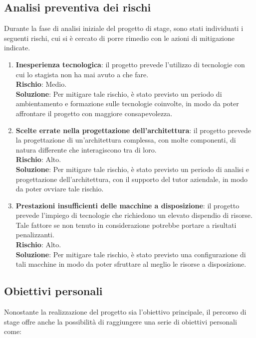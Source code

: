 \subsection{Analisi preventiva dei rischi}
Durante la fase di analisi iniziale del progetto di stage, sono stati individuati i seguenti rischi, cui si è cercato di porre rimedio con le azioni di mitigazione indicate. \\
\begin{enumerate}
    \item \textbf{Inesperienza tecnologica}: il progetto prevede l'utilizzo di tecnologie con cui lo stagista non ha mai avuto a che fare. \\
    \textbf{Rischio}: Medio.\\
    \textbf{Soluzione}: Per mitigare tale rischio, è stato previsto un periodo di ambientamento e formazione sulle tecnologie coinvolte, in modo da poter affrontare il progetto con maggiore consapevolezza.
    \item \textbf{Scelte errate nella progettazione dell'architettura}: il progetto prevede la progettazione di un'architettura complessa, con molte componenti, di natura differente che interagiscono tra di loro. \\
    \textbf{Rischio}: Alto.\\
    \textbf{Soluzione}: Per mitigare tale rischio, è stato previsto un periodo di analisi e progettazione dell'architettura, con il supporto del tutor aziendale, in modo da poter ovviare tale rischio.
    \item \textbf{Prestazioni insufficienti delle macchine a disposizione}: il progetto prevede l'impiego di tecnologie che richiedono un elevato dispendio di risorse. Tale fattore se non tenuto in considerazione potrebbe portare a risultati penalizzanti. \\
    \textbf{Rischio}: Alto.\\
    \textbf{Soluzione}: Per mitigare tale rischio, è stato previsto una configurazione di tali macchine in modo da poter sfruttare al meglio le risorse a disposizione.
\end{enumerate}    
\subsection{Obiettivi personali}
Nonostante la realizzazione del progetto sia l'obiettivo principale, il percorso di stage offre anche la possibilità di raggiungere una serie di obiettivi personali come: 


